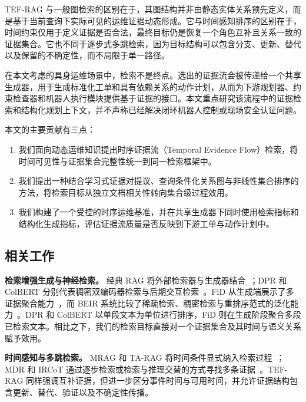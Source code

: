 TEF-RAG 与一般图检索的区别在于，其图结构并非由静态实体关系预先定义，而是基于当前查询下实际可见的运维证据动态形成。它与时间感知排序的区别在于，时间约束仅用于定义证据是否合法，最终目标仍是恢复一个角色互补且关系一致的证据集合。它也不同于逐步式多跳检索，因为目标结构可以包含分支、更新、替代以及保留的不确定性，而不局限于单一路径。

在本文考虑的具身运维场景中，检索不是终点。选出的证据流会被传递给一个共享生成器，用于生成标准化工单和具有依赖关系的动作计划，从而为下游规划器、约束检查器和机器人执行模块提供基于证据的接口。本文重点研究该流程中的证据检索和结构化规划上下文，并不声称已经解决闭环机器人控制或现场安全认证问题。

本文的主要贡献有三点：
\begin{enumerate}
    \item 我们面向动态运维知识提出时序证据流（Temporal Evidence Flow）检索，将时间可见性与证据集合完整性统一到同一检索框架中。
    \item 我们提出一种结合学习式证据对提议、查询条件化关系图与非线性集合排序的方法，将检索目标从独立文档相关性转向集合级过程效用。
    \item 我们构建了一个受控的时序运维基准，并在共享生成器下同时使用检索指标和结构化生成指标，评估证据流质量是否反映到下游工单与动作计划中。
\end{enumerate}

\subsection{相关工作}
\label{sec:related_work}

\textbf{检索增强生成与神经检索。}
经典 RAG 将外部检索器与生成器结合~\cite{lewis2020rag}；DPR 和 ColBERT 分别代表稠密双编码器检索与后期交互检索~\cite{karpukhin2020dpr,khattab2020colbert}。FiD 从生成端展示了多证据聚合能力~\cite{izacard2021fid}，而 BEIR 系统比较了稀疏检索、稠密检索与重排序范式的泛化能力~\cite{thakur2021beir}。DPR 和 ColBERT 以单段文本为单位进行排序，FiD 则在生成阶段聚合多段已检索文本。相比之下，我们的检索目标直接对一个证据集合及其时间与语义关系赋予效用。

\textbf{时间感知与多跳检索。}
MRAG 和 TA-RAG 将时间条件显式纳入检索过程~\cite{zhang2025mrag,lau2025tarag}；MDR 和 IRCoT 通过逐步检索或检索与推理交替的方式寻找多条证据~\cite{xiong2021mdr,trivedi2023ircot}。TEF-RAG 同样强调互补证据，但进一步区分事件时间与可用时间，并允许证据结构包含更新、替代、验证以及不确定性传播。

